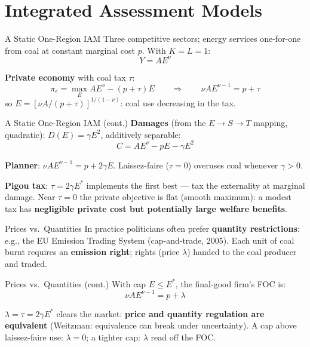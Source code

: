\documentclass[blue]{beamer}
\begin{document}
\section{Integrated Assessment Models}

\begin{frame}{A Static One-Region IAM}
Three competitive sectors; energy services one-for-one from coal at constant marginal cost $p$. With $K = L = 1$:
\[
Y = AE^{\nu}
\]

\textbf{Private economy} with coal tax $\tau$:
\[
\pi_e = \max_E AE^{\nu} - (p + \tau)E \qquad \Rightarrow \qquad \nu AE^{\nu - 1} = p + \tau
\]
so $E = \left[\nu A/(p+\tau)\right]^{1/(1-\nu)}$: coal use decreasing in the tax.

\end{frame}

\begin{frame}{A Static One-Region IAM (cont.)}
\bigskip
\textbf{Damages} (from the $E \to S \to T$ mapping, quadratic): $D(E) = \gamma E^2$, additively separable:
\[
C = AE^{\nu} - pE - \gamma E^2
\]

\textbf{Planner}: $\nu AE^{\nu-1} = p + 2\gamma E$. Laissez-faire ($\tau = 0$) overuses coal whenever $\gamma > 0$.

\bigskip
\textbf{Pigou tax}: $\tau = 2\gamma E^*$ implements the first best --- tax the externality at marginal damage. Near $\tau = 0$ the private objective is flat (smooth maximum): a modest tax has \textbf{negligible private cost but potentially large welfare benefits}.
\end{frame}

\begin{frame}{Prices vs.\ Quantities}
In practice politicians often prefer \textbf{quantity restrictions}: e.g., the EU Emission Trading System (cap-and-trade, 2005). Each unit of coal burnt requires an \textbf{emission right}; rights (price $\lambda$) handed to the coal producer and traded.

\end{frame}

\begin{frame}{Prices vs.\ Quantities (cont.)}
\bigskip
With cap $E \leq E^*$, the final-good firm's FOC is:
\[
\nu AE^{\nu - 1} = p + \lambda
\]

$\lambda = \tau = 2\gamma E^*$ clears the market: \textbf{price and quantity regulation are equivalent} (Weitzman: equivalence can break under uncertainty). A cap above laissez-faire use: $\lambda = 0$; a tighter cap: $\lambda$ read off the FOC.

\end{frame}
\end{document}
